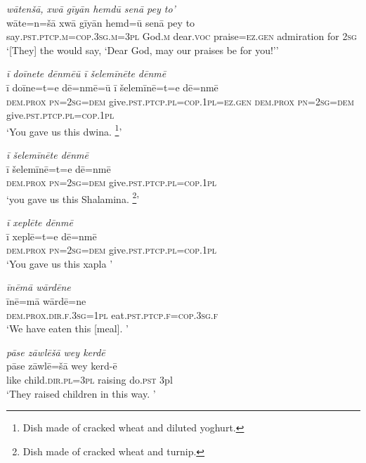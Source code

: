 \ea \label{ŽE.49}
\textit{wātenšā, xwā gīyān hemdū senā pey to’} \\ 
\gll wāte=n=šā xwā gīyān hemd=ū senā pey to \\ 
 say\textsc{.pst}\textsc{.ptcp}\textsc{.m}\textsc{=cop}\textsc{.3sg}\textsc{.m}\textsc{=3pl} God\textsc{.m} dear.\textsc{voc} praise\textsc{\textsc{=ez.gen}} admiration for \textsc{2sg} \\ 
\glt `[They] the would say, ‘Dear God, may our praises be for you!’'
\z 
 
\ea \label{ŽE.50}
\textit{ī doīnete dēnmēū ī šelemīnēte dēnmē} \\ 
\gll ī doīne=t=e dē=nmē=ū ī šelemīnē=t=e dē=nmē \\ 
 \textsc{dem.prox} \textsc{pn}\textsc{=\textsc{2sg}}\textsc{=dem} give\textsc{.pst}\textsc{.ptcp}\textsc{.pl}\textsc{=cop}\textsc{.1pl}\textsc{\textsc{=ez.gen}} \textsc{dem.prox} \textsc{pn}\textsc{=\textsc{2sg}}\textsc{=dem} give\textsc{.pst}\textsc{.ptcp}\textsc{.pl}\textsc{=cop}\textsc{.1pl} \\ 
\glt `You gave us this dwina. \footnote{Dish made of cracked wheat and diluted yoghurt.}'
\z 
 
\ea \label{ŽE.51}
\textit{ī šelemīnēte dēnmē} \\ 
\gll ī šelemīnē=t=e dē=nmē \\ 
 \textsc{dem.prox} \textsc{pn}\textsc{=\textsc{2sg}}\textsc{=dem} give\textsc{.pst}\textsc{.ptcp}\textsc{.pl}\textsc{=cop}\textsc{.1pl} \\ 
\glt `you gave us this Shalamina. \footnote{Dish made of cracked wheat and turnip.}'
\z 
 
\ea \label{ŽE.52}
\textit{ī xeplēte dēnmē} \\ 
\gll ī xeplē=t=e dē=nmē \\ 
 \textsc{dem.prox} \textsc{pn}\textsc{=\textsc{2sg}}\textsc{=dem} give\textsc{.pst}\textsc{.ptcp}\textsc{.pl}\textsc{=cop}\textsc{.1pl} \\ 
\glt `You gave us this xapla '
\z 
 
\ea \label{ŽE.53}
\textit{īnēmā wārdēne} \\ 
\gll īnē=mā wārdē=ne \\ 
 \textsc{dem.prox}\textsc{.dir}\textsc{.f}\textsc{.3sg}\textsc{=1pl} eat\textsc{.pst}\textsc{.ptcp}\textsc{.f}\textsc{=cop}\textsc{.3sg}\textsc{.f} \\ 
\glt `We have eaten this [meal]. '
\z 
 
\ea \label{ŽE.55}
\textit{pāse zāwlēšā wey kerdē} \\ 
\gll pāse zāwlē=šā wey kerd-ē \\ 
 like child\textsc{.dir}\textsc{.pl}\textsc{=3pl} raising do\textsc{.pst} 3pl \\ 
\glt `They raised children in this way. '
\z 
 
